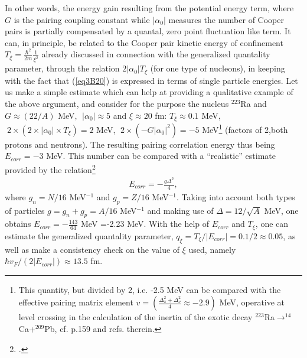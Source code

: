 \begin{subappendices}
 
 In other words, the energy gain resulting from the potential energy term, where $G$ is the pairing coupling constant while $|\alpha_0|$ measures the number of Cooper pairs is partially compensated by a quantal, zero point fluctuation like term. It can, in principle, be related to the Cooper pair kinetic energy of confinement $T_\xi=\frac{\hbar^2}{2m}\frac{1}{\xi^2}$ already discussed in connection with the generalized quantality parameter, through the relation $2|\alpha_0|T_\xi$ (for one type of nucleons), in keeping with the fact that (\ref{eq3B20}) is expressed in terms of single particle energies. Let us make a simple estimate which can help at providing a qualitative example of the above argument, and consider for the purpose the nucleus $^{223}$Ra and $G\approx(22/A)$ MeV,      $\;|\alpha_0|\approx 5$ and $\xi\approx 20$ fm: $T_\xi\approx 0.1 $ MeV, $\;2\times(2\times|\alpha_0|\times T_\xi)=2$ MeV, $\;2\times (-G|\alpha_0|^2)=-5$ MeV\footnote{This quantity, but divided by 2, i.e. -2.5 MeV can be compared with the effective pairing matrix element $v=\left(\frac{\Delta_\pi^2+\Delta_\nu^2}{4}\approx -2.9 \right)$ MeV, operative at level crossing in the calculation of the inertia of the exotic decay $^{223}$Ra$\rightarrow^{14}$Ca+$^{209}$Pb, cf. \cite{Brink:05} p.159 and refs. therein.} (factors of 2,both protons and neutrons). The resulting pairing correlation energy thus being $E_{corr}=-3$ MeV. This number can be compared with a ``realistic'' estimate provided by the relation\footnote{\cite{Brink:05}.}
   \begin{align}\label{eq3B21}
E_{corr}=-\frac{g\Delta^2}{4},
   \end{align}  
 where $g_n=N/16$ MeV$^{-1}$ and $g_p=Z/16$ MeV$^{-1}$. Taking into account both types of particles $g=g_n+g_p=A/16$ MeV$^{-1}$ and making use of $\Delta=12/\sqrt{A}$ MeV, one obtains $E_{corr}=-\frac{143}{64}$ MeV =-2.23 MeV. With the help of $E_{corr}$ and $T_\xi$, one can estimate the generalized quantality parameter, $q_\xi=T_\xi/|E_{corr}|=0.1/2\approx 0.05$, as well as make a consistency check  on the value of $\xi$ used, namely $\hbar v_F/(2|E_{corr}|)\approx 13.5$ fm.
 

\end{subappendices}
